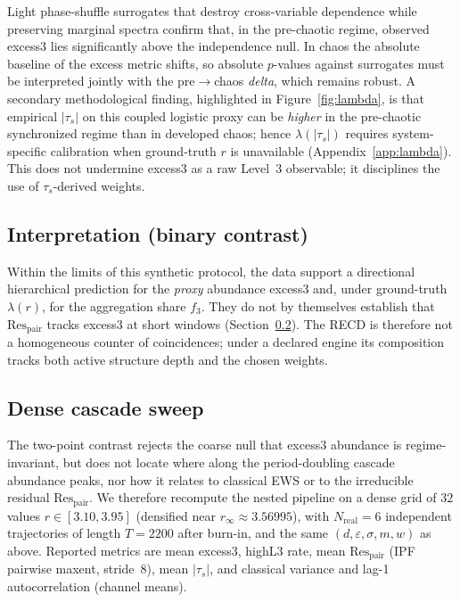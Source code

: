 \documentclass[11pt,a4paper]{article}
\begin{document}
Light phase-shuffle surrogates that destroy cross-variable dependence
while preserving marginal spectra \cite{Theiler1992} confirm that, in
the pre-chaotic regime, observed excess3 lies significantly above the
independence null. In chaos the absolute baseline of the excess metric
shifts, so absolute $p$-values against surrogates must be interpreted
jointly with the pre$\to$chaos \emph{delta}, which remains robust. A
secondary methodological finding, highlighted in Figure~\ref{fig:lambda},
is that empirical $|\tau_s|$ on this coupled logistic proxy can be
\emph{higher} in the pre-chaotic synchronized regime than in developed
chaos; hence $\lambda(|\tau_s|)$ requires system-specific calibration
when ground-truth $r$ is unavailable (Appendix~\ref{app:lambda}). This
does not undermine excess3 as a raw Level~3 observable; it disciplines
the use of $\tau_s$-derived weights.

\subsection{Interpretation (binary contrast)}

Within the limits of this synthetic protocol, the data support a
directional hierarchical prediction for the \emph{proxy} abundance
excess3 and, under ground-truth $\lambda(r)$, for the aggregation share
$f_3$. They do not by themselves establish that
$\mathrm{Res}_{\mathrm{pair}}$ tracks excess3 at short windows
(Section~\ref{sec:cascade_sweep}). The RECD is therefore not a
homogeneous counter of coincidences; under a declared engine its
composition tracks both active structure depth and the chosen weights.

\subsection{Dense cascade sweep}
\label{sec:cascade_sweep}

The two-point contrast rejects the coarse null that excess3 abundance is
regime-invariant, but does not locate where along the period-doubling
cascade abundance peaks, nor how it relates to classical EWS or to the
irreducible residual $\mathrm{Res}_{\mathrm{pair}}$.
We therefore recompute the nested pipeline on a dense grid of
$32$ values $r\in[3.10,3.95]$ (densified near
$r_\infty\approx 3.56995$), with $N_{\mathrm{real}}=6$ independent
trajectories of length $T=2200$ after burn-in, and the same
$(d,\varepsilon,\sigma,m,w)$ as above. Reported metrics are mean excess3,
highL3 rate, mean $\mathrm{Res}_{\mathrm{pair}}$ (IPF pairwise maxent,
stride~$8$), mean $|\tau_s|$, and classical variance and lag-1
autocorrelation (channel means).
\end{document}
